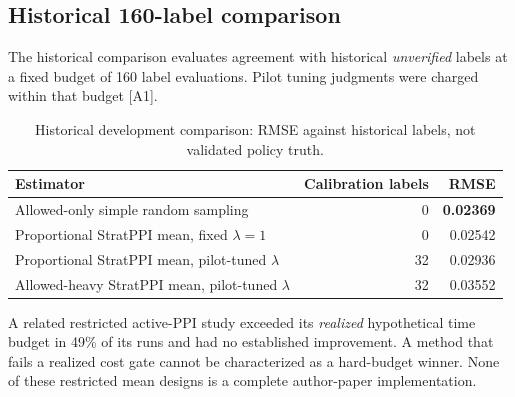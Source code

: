 \documentclass[11pt,a4paper]{article}
\begin{document}
\subsection{Historical 160-label comparison}
The historical comparison evaluates agreement with historical \emph{unverified} labels at a fixed budget of 160 label evaluations. Pilot tuning judgments were charged within that budget [A1].
\begin{table}[H]\centering\small
\caption{Historical development comparison: RMSE against historical labels, not validated policy truth.}
\begin{tabular}{@{}lrr@{}}\toprule
Estimator & Calibration labels & RMSE\\\midrule
Allowed-only simple random sampling & 0 & \textbf{0.02369}\\
Proportional StratPPI mean, fixed $\lambda=1$ & 0 & 0.02542\\
Proportional StratPPI mean, pilot-tuned $\lambda$ & 32 & 0.02936\\
Allowed-heavy StratPPI mean, pilot-tuned $\lambda$ & 32 & 0.03552\\\bottomrule
\end{tabular}
\end{table}
A related restricted active-PPI study exceeded its \emph{realized} hypothetical time budget in 49\% of its runs and had no established improvement. A method that fails a realized cost gate cannot be characterized as a hard-budget winner. None of these restricted mean designs is a complete author-paper implementation.
\end{document}
